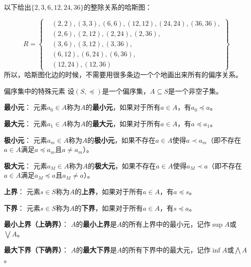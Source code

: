 \documentclass[lang=cn,11pt]{elegantbook}
\begin{document}
以下给出$\{2,3,6,12,24,36\}$的整除关系的哈斯图：
\begin{figure}[!ht]
\centering
{}%
\end{figure}
\[
R = \left\{
\begin{aligned}
& (2,2), (3,3), (6,6), (12,12), (24,24), (36,36), \\
& (2,6), (2,12), (2,24), (2,36), \\
& (3,6), (3,12), (3,36), \\
& (6,12), (6,24), (6,36), \\
& (12,24), (12,36)
\end{aligned}
\right\}
\]
所以，哈斯图化边的时候，不需要用很多条边一个个地画出来所有的偏序关系。
\begin{definition}{偏序集中的特殊元素}
设$(S, \preccurlyeq)$是一个偏序集，$A \subseteq S$是一个非空子集。

\textbf{最小元}：
元素$a_0 \in A$称为$A$的\textbf{最小元}，如果对于所有$a \in A$，有$a_0 \preccurlyeq a$。

\textbf{最大元}：
元素$a_1 \in A$称为$A$的\textbf{最大元}，如果对于所有$a \in A$，有$a \preccurlyeq a_1$。

\textbf{极小元}：
元素$a_m \in A$称为$A$的\textbf{极小元}，如果不存在$a \in A$使得$a \prec a_m$（即不存在$a \in A$满足$a \preccurlyeq a_m$且$a \neq a_m$）。

\textbf{极大元}：
元素$a_M \in A$称为$A$的\textbf{极大元}，如果不存在$a \in A$使得$a_M \prec a$（即不存在$a \in A$满足$a_M \preccurlyeq a$且$a_M \neq a$）。

\textbf{上界}：
元素$s \in S$称为$A$的\textbf{上界}，如果对于所有$a \in A$，有$a \preccurlyeq s$。

\textbf{下界}：
元素$s \in S$称为$A$的\textbf{下界}，如果对于所有$a \in A$，有$s \preccurlyeq a$。

\textbf{最小上界（上确界）}：
$A$的\textbf{最小上界}是$A$的所有上界中的最小元，记作$\sup A$或$\bigvee A$。

\textbf{最大下界（下确界）}：
$A$的\textbf{最大下界}是$A$的所有下界中的最大元，记作$\inf A$或$\bigwedge A$。
\end{definition}
\end{document}
